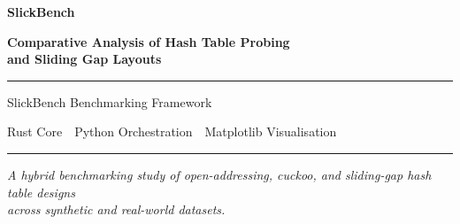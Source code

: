 \documentclass[11pt,a4paper]{article}
\begin{document}
\begin{titlepage}
  \centering
  \vspace*{2cm}
  {\Huge\bfseries\color{accentblue} SlickBench\par}
  \vspace{0.4cm}
  {\large\bfseries Comparative Analysis of Hash Table Probing\\and Sliding Gap Layouts\par}
  \vspace{1.5cm}
  \rule{\linewidth}{0.5pt}
  \vspace{0.5cm}
  {\normalsize SlickBench Benchmarking Framework\par}
  {\normalsize Rust Core~\textbar~Python Orchestration~\textbar~Matplotlib Visualisation\par}
  \vspace{0.5cm}
  \rule{\linewidth}{0.5pt}
  \vfill
  {\small\itshape A hybrid benchmarking study of open-addressing, cuckoo, and sliding-gap hash table designs\\across synthetic and real-world datasets.\par}
  \vspace{2cm}
\end{titlepage}

\tableofcontents
\newpage

\begin{abstract}
This report presents a comprehensive benchmarking study of diverse hash table implementations, ranging from traditional open-addressing schemes (Linear and Quadratic Probing) to more complex structures like Cuckoo Hashing and Slick Hashing. We evaluate these structures across various synthetic and real-world datasets, measuring both time performance (nanoseconds per operation) and space efficiency (bytes per element). Our findings highlight the significant performance of the standard library implementation while illustrating the trade-offs in memory overhead and probe locality for the specialised Slick Hash structure.
\end{abstract}

\vspace{1em}
\end{document}
